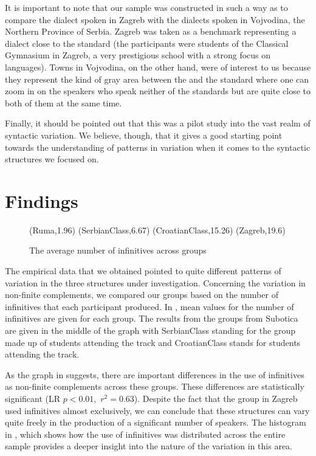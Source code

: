 \documentclass[output=paper,modfonts,newtxmath,hidelinks,]{langscibook}
\begin{document}
It is important to note that our sample was constructed in such a way as to compare the dialect spoken in Zagreb with the dialects spoken in Vojvodina, the Northern Province of Serbia. Zagreb was taken as a benchmark representing a dialect close to the  standard (the participants were students of the Classical Gymnasium in Zagreb, a very prestigious school with a strong focus on languages). Towns in Vojvodina, on the other hand, were of interest to us because they represent the kind of gray area between the  and the  standard where one can zoom in on the speakers who speak neither of the standards but are quite close to both of them at the same time.

Finally, it should be pointed out that this was a pilot study into the vast realm of syntactic variation. We believe, though, that it gives a good starting point towards the understanding of patterns in variation when it comes to the syntactic structures we focused on.\largerpage

\section{Findings}\label{7:s3}

\begin{figure}[b]
\footnotesize
\textsf{ 
%
{
(Ruma,1.96)
(SerbianClass,6.67)
(CroatianClass,15.26)
(Zagreb,19.6)
}}
\caption{The average number of infinitives across groups}\label{7:fig:key:1}
\end{figure}


The empirical data that we obtained pointed to quite different patterns of variation in the three structures under investigation. Concerning the variation in non-finite complements, we compared our groups based on the number of infinitives that each participant produced. In , mean values for the number of infinitives are given for each group. The results from the groups from Subotica are given in the middle of the graph with \textsf{SerbianClass} standing for the group made up of students attending the  track and 
\textsf{CroatianClass} stands for students attending the  track.

\newpage 
As the graph in  suggests, there are important differences in the use of infinitives as non-finite complements across these groups. These differences are statistically significant (LR $p<0.01,$ $r^2 = 0.63$). Despite the fact that the group in Zagreb used infinitives almost exclusively, we can conclude that these structures can vary quite freely in the production of a significant number of speakers. The histogram in , which shows how the use of infinitives was distributed across the entire sample provides a deeper insight into the nature of the variation in this area.
\end{document}
